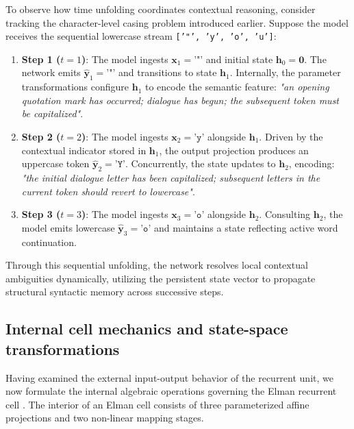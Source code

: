 \documentclass[../../../main.tex]{subfiles}
\begin{document}
To observe how time unfolding coordinates contextual reasoning, consider tracking the character-level casing problem introduced earlier. Suppose the model receives the sequential lowercase stream \texttt{['"', 'y', 'o', 'u']}:
\begin{enumerate}
    \item \textbf{Step 1 ($t=1$)}: The model ingests $\mathbf{x}_1 = \texttt{'"'}$ and initial state $\mathbf{h}_0 = \mathbf{0}$. The network emits $\hat{\mathbf{y}}_1 = \texttt{'"'}$ and transitions to state $\mathbf{h}_1$. Internally, the parameter transformations configure $\mathbf{h}_1$ to encode the semantic feature: \textit{"an opening quotation mark has occurred; dialogue has begun; the subsequent token must be capitalized"}.
    \item \textbf{Step 2 ($t=2$)}: The model ingests $\mathbf{x}_2 = \texttt{'y'}$ alongside $\mathbf{h}_1$. Driven by the contextual indicator stored in $\mathbf{h}_1$, the output projection produces an uppercase token $\hat{\mathbf{y}}_2 = \texttt{'Y'}$. Concurrently, the state updates to $\mathbf{h}_2$, encoding: \textit{"the initial dialogue letter has been capitalized; subsequent letters in the current token should revert to lowercase"}.
    \item \textbf{Step 3 ($t=3$)}: The model ingests $\mathbf{x}_3 = \texttt{'o'}$ alongside $\mathbf{h}_2$. Consulting $\mathbf{h}_2$, the model emits lowercase $\hat{\mathbf{y}}_3 = \texttt{'o'}$ and maintains a state reflecting active word continuation.
\end{enumerate}

Through this sequential unfolding, the network resolves local contextual ambiguities dynamically, utilizing the persistent state vector to propagate structural syntactic memory across successive steps.

\subsection{Internal cell mechanics and state-space transformations}
\label{subsec:rnn_internal_cell_mechanics}

Having examined the external input-output behavior of the recurrent unit, we now formulate the internal algebraic operations governing the Elman recurrent cell \citep{elman1990}. The interior of an Elman cell consists of three parameterized affine projections and two non-linear mapping stages.
\end{document}

